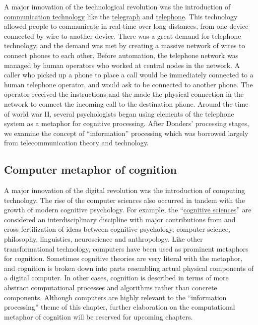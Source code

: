 \documentclass[
  oneside,
  12pt]{crumpbook}
\begin{document}
A major innovation of the technological revolution was the introduction of \href{https://en.wikipedia.org/wiki/Telecommunication}{communication technology} like the \href{https://en.wikipedia.org/wiki/Electrical_telegraph}{telegraph} and \href{https://en.wikipedia.org/wiki/Telephone}{telephone}. This technology allowed people to communicate in real-time over long distances, from one device connected by wire to another device. There was a great demand for telephone technology, and the demand was met by creating a massive network of wires to connect phones to each other. Before automation, the telephone network was managed by human operators who worked at central nodes in the network. A caller who picked up a phone to place a call would be immediately connected to a human telephone operator, and would ask to be connected to another phone. The operator received the instructions and the made the physical connection in the network to connect the incoming call to the destination phone. Around the time of world war II, several psychologists began using elements of the telephone system as a metaphor for cognitive processing. After Donders' processing stages, we examine the concept of ``information'' processing which was borrowed largely from telecommunication theory and technology.

\hypertarget{computer-metaphor-of-cognition}{%
\subsection{Computer metaphor of cognition}\label{computer-metaphor-of-cognition}}

A major innovation of the digital revolution was the introduction of computing technology. The rise of the computer sciences also occurred in tandem with the growth of modern cognitive psychology. For example, the ``\href{https://en.wikipedia.org/wiki/Cognitive_science}{cognitive sciences}'' are considered an interdisciplinary discipline with major contributions from and cross-fertilization of ideas between cognitive psychology, computer science, philosophy, linguistics, neuroscience and anthropology. Like other transformational technology, computers have been used as prominent metaphors for cognition. Sometimes cognitive theories are very literal with the metaphor, and cognition is broken down into parts resembling actual physical components of a digital computer. In other cases, cognition is described in terms of more abstract computational processes and algorithms rather than concrete components. Although computers are highly relevant to the ``information processing'' theme of this chapter, further elaboration on the computational metaphor of cognition will be reserved for upcoming chapters.
\end{document}
